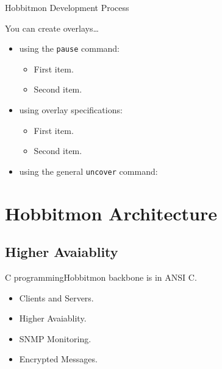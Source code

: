 \documentclass{beamer}
\begin{document}
\begin{frame}{Hobbitmon Development Process }

  You can create overlays\dots
  \begin{itemize}
  \item using the \texttt{pause} command:
    \begin{itemize}
    \item
      First item.
      \pause
    \item    
      Second item.
    \end{itemize}
  \item
    using overlay specifications:
    \begin{itemize}
    \item<3->
      First item.
    \item<4->
      Second item.
    \end{itemize}
  \item
    using the general \texttt{uncover} command:
    \begin{itemize}
    \end{itemize}
  \end{itemize}
\end{frame}



\section{Hobbitmon Architecture}

\subsection[Clients and Servers]{Higher Avaiablity}

\begin{frame}{C programming}{Hobbitmon backbone is in ANSI C.}

  \begin{itemize}
  \item
    Clients and Servers.
  \item
    Higher Avaiablity.
  \item
    SNMP Monitoring.
  \item
    Encrypted Messages. 
  \end{itemize}
\end{frame}
\end{document}

